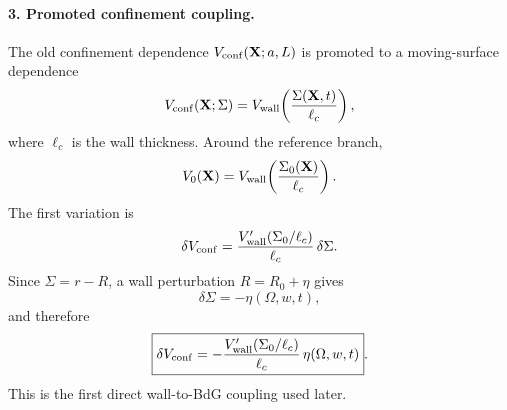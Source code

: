 \paragraph{3. Promoted confinement coupling.}
The old confinement dependence \(V_{\rm conf}(\mathbf X;a,L)\) is promoted to a moving-surface dependence
\begin{equation}
\label{eq:app-stage001-promoted-conf}
V_{\rm conf}(\mathbf X;\Sigma)=V_{\rm wall}\!\left(\frac{\Sigma(\mathbf X,t)}{\ell_c}\right),
\end{equation}
where \(\ell_c\) is the wall thickness.  Around the reference branch,
\begin{equation}
V_0(\mathbf X)=V_{\rm wall}\!\left(\frac{\Sigma_0(\mathbf X)}{\ell_c}\right).
\end{equation}
The first variation is
\begin{equation}
\label{eq:app-stage001-delta-v-general}
\delta V_{\rm conf}
=\frac{V_{\rm wall}'(\Sigma_0/\ell_c)}{\ell_c}\,\delta\Sigma.
\end{equation}
Since \(\Sigma=r-R\), a wall perturbation \(R=R_0+\eta\) gives
\begin{equation}
\label{eq:app-stage001-delta-sigma}
\delta\Sigma=-\eta(\Omega,w,t),
\end{equation}
and therefore
\begin{equation}
\label{eq:app-stage001-delta-v}
\boxed{
\delta V_{\rm conf}
=-\frac{V_{\rm wall}'(\Sigma_0/\ell_c)}{\ell_c}\,\eta(\Omega,w,t)}.
\end{equation}
This is the first direct wall-to-BdG coupling used later.

